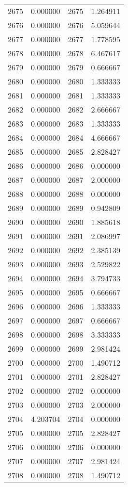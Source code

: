 \documentclass[12pt]{article}
\begin{document}
\begin{longtable}{@{}cccc@{}}
2675 & 0.000000 & 2675 & 1.264911 \\
2676 & 0.000000 & 2676 & 5.059644 \\
2677 & 0.000000 & 2677 & 1.778595 \\
2678 & 0.000000 & 2678 & 6.467617 \\
2679 & 0.000000 & 2679 & 0.666667 \\
2680 & 0.000000 & 2680 & 1.333333 \\
2681 & 0.000000 & 2681 & 1.333333 \\
2682 & 0.000000 & 2682 & 2.666667 \\
2683 & 0.000000 & 2683 & 1.333333 \\
2684 & 0.000000 & 2684 & 4.666667 \\
2685 & 0.000000 & 2685 & 2.828427 \\
2686 & 0.000000 & 2686 & 0.000000 \\
2687 & 0.000000 & 2687 & 2.000000 \\
2688 & 0.000000 & 2688 & 0.000000 \\
2689 & 0.000000 & 2689 & 0.942809 \\
2690 & 0.000000 & 2690 & 1.885618 \\
2691 & 0.000000 & 2691 & 2.086997 \\
2692 & 0.000000 & 2692 & 2.385139 \\
2693 & 0.000000 & 2693 & 2.529822 \\
2694 & 0.000000 & 2694 & 3.794733 \\
2695 & 0.000000 & 2695 & 0.666667 \\
2696 & 0.000000 & 2696 & 1.333333 \\
2697 & 0.000000 & 2697 & 0.666667 \\
2698 & 0.000000 & 2698 & 3.333333 \\
2699 & 0.000000 & 2699 & 2.981424 \\
2700 & 0.000000 & 2700 & 1.490712 \\
2701 & 0.000000 & 2701 & 2.828427 \\
2702 & 0.000000 & 2702 & 0.000000 \\
2703 & 0.000000 & 2703 & 2.000000 \\
2704 & 4.203704 & 2704 & 0.000000 \\
2705 & 0.000000 & 2705 & 2.828427 \\
2706 & 0.000000 & 2706 & 0.000000 \\
2707 & 0.000000 & 2707 & 2.981424 \\
2708 & 0.000000 & 2708 & 1.490712 \\

\end{longtable}
\end{document}
